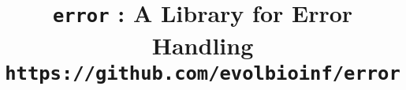 

\pagestyle{noweb}

\title{\texttt{error} : A Library for Error
  Handling\\\small \texttt{https://github.com/evolbioinf/error}}
\author{}

\date{}
\maketitle







